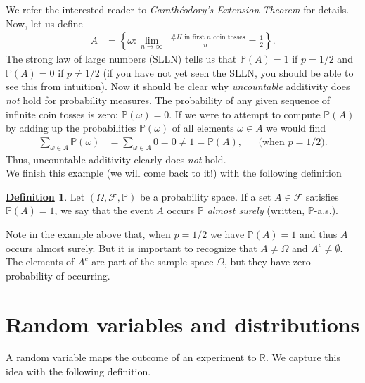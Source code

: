 \documentclass[12pt]{book}
\numberwithin{equation}{chapter}
\theoremstyle{plain}
\numberwithin{theorem}{section}
\theoremstyle{definition}
\newtheorem{definition}[theorem]{\underline{Definition}}
\numberwithin{exercise}{chapter}
\newcommand{\<}{\langle}
\renewcommand{\>}{\rangle}
\renewcommand{\(}{\left(}
\renewcommand{\)}{\right)}
\renewcommand{\[}{\left[}
\renewcommand{\]}{\right]}
\newcommand\Pb{\mathds{P}}
\newcommand\Rb{\mathds{R}}
\newcommand\Fc{\mathscr{F}}
\newcommand\om{\omega}
\newcommand\Om{\Omega}
\newcommand\sig{\sigma}
\begin{document}
We refer the interested reader to \emph{Carath\'eodory's Extension Theorem} for details.
\\[0.5em]
Now, let us define
\begin{align}
A
	&=	\left\{ \om : \lim_{n \to \infty} \frac{ \text{ $\#H$ in first $n$ coin tosses} }{ n } = \frac{1}{2} \right\} .
\end{align}
The strong law of large numbers (SLLN) tells us that $\Pb( A ) = 1$ if $p = 1/2$ and $\Pb( A ) = 0$ if $p \neq 1/2$ (if you have not yet seen the SLLN, you should be able to see this from intuition).  Now it should be clear why \emph{uncountable} additivity does \emph{not} hold for probability measures.  The probability of any given sequence of infinite coin tosses is zero: $\Pb(\om)=0$.  If we were to attempt to compute $\Pb(A)$ by adding up the probabilities $\Pb(\om)$ of all elements $\om \in A$ we would find
\begin{align}
\sum_{\om \in A} \Pb(\om) 
	&= \sum_{\om \in A} 0 = 0
	\neq 1 = \Pb(A), &
	&		\text{(when $p = 1/2$)} .
\end{align}
Thus, uncountable additivity clearly does \emph{not} hold.
\\[0.5em]
We finish this example (we will come back to it!) with the following definition
\begin{definition}
Let $(\Om,\Fc,\Pb)$ be a probability space. If a set  $A \in \Fc$ satisfies $\Pb(A)  = 1$, we say that the event $A$ occurs \emph{$\Pb$ almost surely} (written, $\Pb$-a.s.).
\end{definition}
\noindent
Note in the example above that, when $p = 1/2$ we have $\Pb(A)=1$ and thus $A$ occurs almost surely.  But it is important to recognize that $A \neq \Om$ and $A^c \neq \emptyset$.  The elements of $A^c$ are part of the sample space $\Om$, but they have zero probability of occurring.


\section{Random variables and distributions}
A random variable maps the outcome of an experiment to $\Rb$.  We capture this idea with the following definition.
\end{document}
